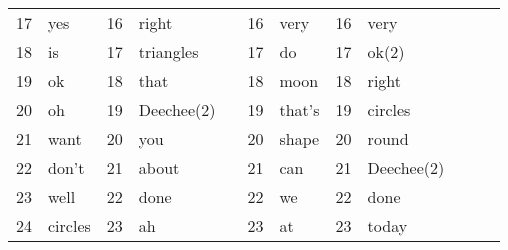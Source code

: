 \begin{screenonly}
\begin{table*}[h]
\begin{center}
\begin{tabular*}{\hsize}{@{\extracolsep{\fill}}llllllllllll}
      17 & yes & 16 & right & \hspace*{5ex} & 16 & very & 16 & very\\
      18 & is & 17 & triangles & \hspace*{5ex} & 17 & do & 17 & ok(2)\\
      19 & ok & 18 & that & \hspace*{5ex} & 18 & moon & 18 & right\\
      20 & oh & 19 & Deechee(2) & \hspace*{5ex} & 19 & that's & 19 & circles\\
      21 & want & 20 & you & \hspace*{5ex} & 20 & shape & 20 & round\\
      22 & don't & 21 & about & \hspace*{5ex} & 21 & can & 21 & Deechee(2)\\
      23 & well & 22 & done & \hspace*{5ex} & 22 & we & 22 & done\\
      24 & circles & 23 & ah & \hspace*{5ex} & 23 & at & 23 & today\\
      \bottomrule
    \end{tabular*}
  \end{center}
\end{table*}


\end{screenonly}
